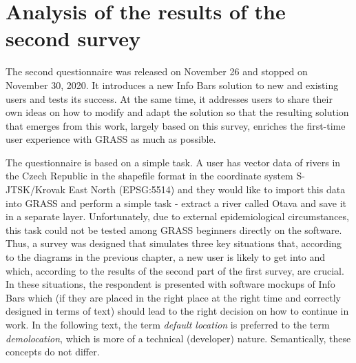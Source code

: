 \documentclass[a4paper,10pt,twoside]{article}
\begin{document}
\newpage
\vspace*{-1cm}
\section{Analysis of the results of the second survey}
\label{sec:qstat2}

\noindent The second questionnaire was released on November 26 and stopped on November 30, 2020. It introduces a new Info Bars solution to new and existing users and tests its success. At the same time, it addresses users to share their own ideas on how to modify and adapt the solution so that the resulting solution that emerges from this work, largely based on this survey, enriches the first-time user experience with GRASS as much as possible.

The questionnaire is based on a simple task. A user has vector data of rivers in the Czech Republic in the shapefile format in the coordinate system S-JTSK/Krovak East North (EPSG:5514) and they would like to import this data into GRASS and perform a simple task - extract a river called Otava and save it in a separate layer. Unfortunately, due to external epidemiological circumstances, this task could not be tested among GRASS beginners directly on the software. Thus, a survey was designed that simulates three key situations that, according to the diagrams in the previous chapter, a new user is likely to get into and which, according to the results of the second part of the first survey, are crucial. In these situations, the respondent is presented with software mockups of Info Bars which (if they are placed in the right place at the right time and correctly designed in terms of text) should lead to the right decision on how to continue in work. In the following text, the term \textit{default location} is preferred to the term \textit{demolocation}, which is more of a technical (developer) nature. Semantically, these concepts do not differ.
\end{document}
